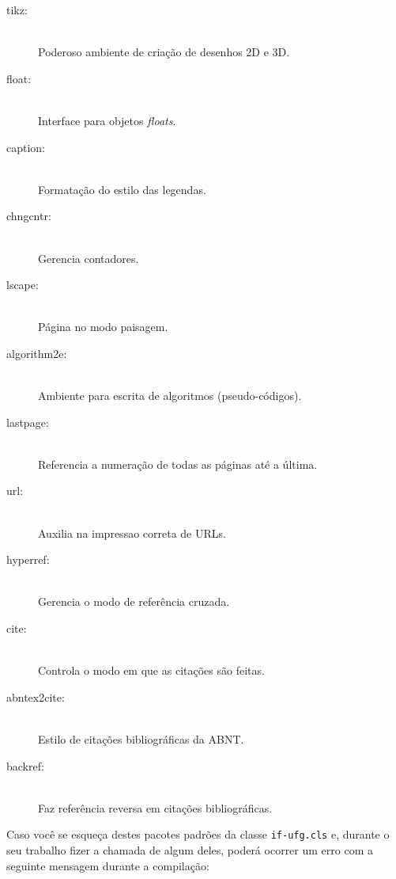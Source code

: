 \begin{description}
\item[tikz:]\hfill\\
Poderoso ambiente de criação de desenhos 2D e 3D.

\item[float:]\hfill\\
Interface para objetos \emph{floats}.

\item[caption:]\hfill\\
Formatação do estilo das legendas.

\item[chngcntr:]\hfill\\
Gerencia contadores.

\item[lscape:]\hfill\\
Página no modo paisagem.

\item[algorithm2e:]\hfill\\
Ambiente para escrita de algoritmos (pseudo-códigos).

\item[lastpage:]\hfill\\
Referencia a numeração de todas as páginas até a última.

\item[url:]\hfill\\
Auxilia na impressao correta de URLs.

\item[hyperref:]\hfill\\
Gerencia o modo de referência cruzada.

\item[cite:]\hfill\\
Controla o modo em que as citações são feitas.

\item[abntex2cite:]\hfill\\
Estilo de citações bibliográficas da ABNT.

\item[backref:]\hfill\\
Faz referência reversa em citações bibliográficas.

\end{description}

Caso você se esqueça destes pacotes padrões da classe \texttt{if-ufg.cls} e, durante o seu trabalho fizer a chamada de algum deles, poderá ocorrer um erro com a seguinte mensagem durante a compilação:

\begin{center}
\colorbox{black!8}{\hspace{\linewidth}\hspace{-2\fboxsep}}
\end{center}

